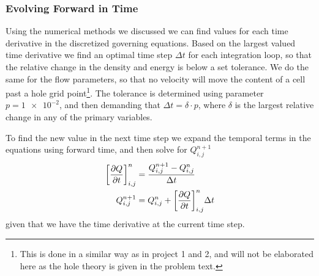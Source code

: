 \documentclass[11pt,a4paper,twocolumn,titlepage]{article}
\newcommand{\disc}[1]    %
{
\ensuremath
\qty[#1]_{i,j}^{n}
}
\begin{document}
\subsubsection{Evolving Forward in Time}\label{subsubsec:Method/Forward time}
Using the numerical methods we discussed we can find values for each time derivative in the discretized governing equations. Based on the largest valued time derivative we find an optimal time step $\Delta t$ for each integration loop, so that the relative change in the density and energy is below a set tolerance. We do the same for the flow parameters, so that no velocity will move the content of a cell past a hole grid point\footnote{This is done in a similar way as in project 1 and 2, and will not be elaborated here as the hole theory is given in the problem text.}. The tolerance is determined using parameter $p=\num{1e-2}$, and then demanding that $\Delta t = \delta \cdot p$, where $\delta$ is the largest relative change in any of the primary variables.

To find the new value in the next time step we expand the temporal terms in the equations using forward time, and then solve for $Q_{i,j}^{n+1}$
\begin{align}
\disc{\pdv{Q}{t}} &= \frac{Q_{i,j}^{n+1}-Q_{i,j}^{n}}{\Delta t}
\label{eq:Forward time}
\\
Q_{i,j}^{n+1} &= Q_{i,j}^{n} + \disc{\pdv{Q}{t}}\Delta t
\label{eq:Q^n+1}
\end{align}
given that we have the time derivative at the current time step. 
\end{document}
